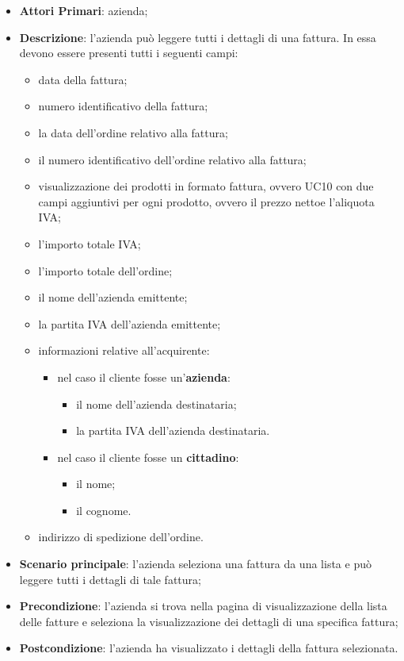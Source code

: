 \begin{itemize}
	\item \textbf{Attori Primari}: azienda;
	\item \textbf{Descrizione}: l'azienda può leggere tutti i dettagli di una fattura. In essa devono essere presenti tutti i seguenti campi:
	\begin{itemize}
		\item data della fattura;
		\item numero identificativo della fattura;
		\item la data dell'ordine relativo alla fattura;
		\item il numero identificativo dell'ordine relativo alla fattura;
		\item visualizzazione dei prodotti in formato fattura, ovvero UC10 con due campi aggiuntivi per ogni prodotto, ovvero il prezzo netto\glosp e l'aliquota IVA;
		\item l'importo totale IVA;
		\item l'importo totale dell'ordine;
		\item il nome dell'azienda emittente;
		\item la partita IVA dell'azienda emittente;
		\item informazioni relative all'acquirente:
		\begin{itemize}
			\item nel caso il cliente fosse un'\textbf{azienda}:
			\begin{itemize}
				\item il nome dell'azienda destinataria;
				\item la partita IVA dell'azienda destinataria.
			\end{itemize}
			\item nel caso il cliente fosse un \textbf{cittadino}:
			\begin{itemize}
				\item il nome;
				\item il cognome.
			\end{itemize}
		\end{itemize}
		
		\item indirizzo di spedizione dell'ordine.
	\end{itemize}
	\item \textbf{Scenario principale}: l'azienda seleziona una fattura da una lista e può leggere tutti i dettagli di tale fattura;
	\item \textbf{Precondizione}: l'azienda si trova nella pagina di visualizzazione della lista delle fatture e seleziona la visualizzazione dei dettagli di una specifica fattura;
	\item \textbf{Postcondizione}: l'azienda ha visualizzato i dettagli della fattura selezionata.
\end{itemize} 



